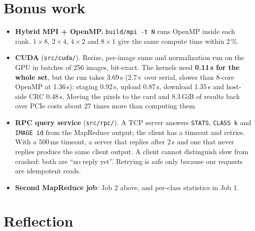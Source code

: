 \documentclass{zc-ust-hw}
\begin{document}
\section{Bonus work}

\begin{itemize}
  \item \textbf{Hybrid MPI + OpenMP.} \texttt{build/mpi -t N} runs OpenMP inside each rank.
    $1\times8$, $2\times4$, $4\times2$ and $8\times1$ give the same compute time within 2\,\%.
  \item \textbf{CUDA} (\texttt{src/cuda/}). Resize, per-image sums and normalization run on the
    GPU in batches of 256 images, bit-exact. The kernels need \textbf{0.11\,s for the whole
    set}, but the run takes 3.69\,s (2.7$\times$ over serial, slower than 8-core OpenMP at
    1.36\,s): staging 0.92\,s, upload 0.87\,s, download 1.35\,s and host-side CRC 0.48\,s.
    Moving the pixels to the card and 8.3\,GiB of results back over PCIe costs about 27 times
    more than computing them.
  \item \textbf{RPC query service} (\texttt{src/rpc/}). A TCP server answers \texttt{STATS},
    \texttt{CLASS k} and \texttt{IMAGE id} from the MapReduce output; the client has a timeout
    and retries. With a 500\,ms timeout, a server that replies after 2\,s and one that never
    replies produce the same client output. A client cannot distinguish slow from crashed: both
    are ``no reply yet''. Retrying is safe only because our requests are idempotent reads.
  \item \textbf{Second MapReduce job}: Job 2 above, and per-class statistics in Job 1.
\end{itemize}

\section{Reflection}
\end{document}
